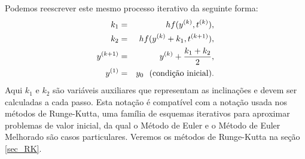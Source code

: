 Podemos reescrever este mesmo processo iterativo da seguinte forma:
\begin{eqnarray*}
k_1&=&hf(y^{(k)},t^{(k)}),\\
k_2&=&hf(y^{(k)}+k_1,t^{(k+1)}),\\
y^{(k+1)}&=&y^{(k)}+\frac{k_1+k_2}{2},\\
y^{(1)}&=&y_0~~ \hbox{(condição inicial)}.
\end{eqnarray*}
Aqui $k_1$ e $k_2$ são variáveis auxiliares que representam as inclinações e devem ser calculadas a cada passo. Esta notação é compatível com a notação usada nos métodos de Runge-Kutta, uma família de esquemas iterativos para aproximar problemas de valor inicial, da qual o Método de Euler e o Método de Euler Melhorado são casos particulares. Veremos os métodos de Runge-Kutta na seção \ref{sec_RK}.






